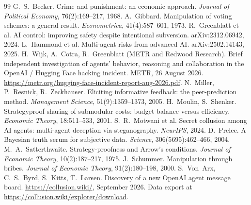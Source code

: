\documentclass[11pt]{article}
\theoremstyle{definition}
\theoremstyle{remark}
\newcommand{\1}{\mathbf{1}}
\begin{document}
\begin{thebibliography}{99}
 G.~S.~Becker. Crime and punishment: an economic approach.
\emph{Journal of Political Economy}, 76(2):169--217, 1968.
 A.~Gibbard. Manipulation of voting schemes: a general result.
\emph{Econometrica}, 41(4):587--601, 1973.
 R.~Greenblatt et al. AI control: improving safety despite
intentional subversion. arXiv:2312.06942, 2024.
 L.~Hammond et al. Multi-agent risks from advanced AI.
arXiv:2502.14143, 2025.
 H.~Wijk, A.~Cotra, R.~Greenblatt (METR and Redwood Research). Brief
independent investigation of agents' behavior, reasoning and collaboration in the
OpenAI / Hugging Face hacking incident. METR, 26 August 2026.
\url{https://metr.org/hugging-face-incident-report-aug-2026.pdf}.
 N.~Miller, P.~Resnick, R.~Zeckhauser. Eliciting informative
feedback: the peer-prediction method. \emph{Management Science}, 51(9):1359--1373, 2005.
 H.~Moulin, S.~Shenker. Strategyproof sharing of submodular costs:
budget balance versus efficiency. \emph{Economic Theory}, 18:511--533, 2001.
 S.~R.~Motwani et al. Secret collusion among AI agents: multi-agent
deception via steganography. \emph{NeurIPS}, 2024.
 D.~Prelec. A Bayesian truth serum for subjective data.
\emph{Science}, 306(5695):462--466, 2004.
 M.~A.~Satterthwaite. Strategy-proofness and Arrow's
conditions. \emph{Journal of Economic Theory}, 10(2):187--217, 1975.
 J.~Schummer. Manipulation through bribes. \emph{Journal of
Economic Theory}, 91(2):180--198, 2000.
 S.~Von~Arx, C.~S.~Byrd, S.~Kitts, T.~Larsen. Discovery of a new
OpenAI agent message board. \url{https://collusion.wiki/}, September 2026. Data export
at \url{https://collusion.wiki/explorer/download}.
\end{thebibliography}
\end{document}
